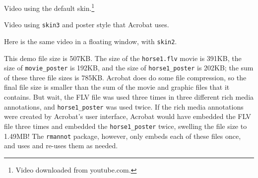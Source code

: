 \documentclass{article}
\begin{document}
\maketitle

\begin{center}
\resizebox{.75\linewidth}{!}
    {}
\end{center}

Video using the default skin.\footnote{Video downloaded from youtube.com.}

\newpage

\begin{center}
\resizebox{.75\linewidth}{!}
    {}%
\end{center}

Video using \texttt{skin3} and poster style that Acrobat uses.

Here is the same video in a floating window, with \texttt{skin2}.

\newpage

This demo file size is 507KB. The size of the \texttt{horse1.flv}
movie is 391KB, the size of \texttt{movie\_poster} is 192KB, and the
size of \texttt{horse1\_poster} is 202KB; the sum of these three
file sizes is 785KB. Acrobat does do some file compression, so the final
file size is smaller than the sum of the movie and graphic files
that it contains. But wait, the FLV file was used three times in
three different rich media annotations, and \texttt{horse1\_poster}
was used twice.  If the rich media annotations were created by
Acrobat's user interface, Acrobat would have embedded the FLV file
three times and embedded the \texttt{horse1\_poster} twice, swelling
the file size to 1.49MB! The \texttt{rmannot} package, however, only
embeds each of these files once, and uses and re-uses them as
needed.
\end{document}
